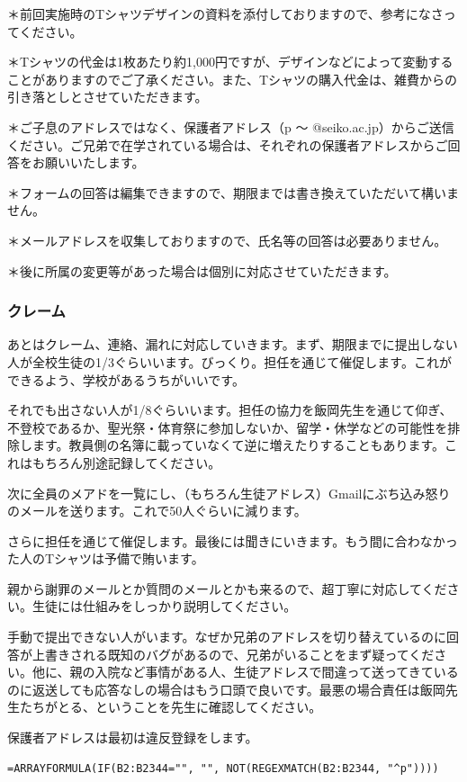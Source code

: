 \documentclass[dvipdfmx,jb5]{jreport}
\begin{document}
＊前回実施時のTシャツデザインの資料を添付しておりますので、参考になさってください。

＊Tシャツの代金は1枚あたり約1,000円ですが、デザインなどによって変動することがありますのでご了承ください。また、Tシャツの購入代金は、雑費からの引き落としとさせていただきます。

＊ご子息のアドレスではなく、保護者アドレス（p 〜 @seiko.ac.jp）からご送信ください。ご兄弟で在学されている場合は、それぞれの保護者アドレスからご回答をお願いいたします。

＊フォームの回答は編集できますので、期限までは書き換えていただいて構いません。

＊メールアドレスを収集しておりますので、氏名等の回答は必要ありません。

＊後に所属の変更等があった場合は個別に対応させていただきます。
\\

\subsubsection{クレーム}
あとはクレーム、連絡、漏れに対応していきます。まず、期限までに提出しない人が全校生徒の1/3ぐらいいます。びっくり。担任を通じて催促します。これができるよう、学校があるうちがいいです。

それでも出さない人が1/8ぐらいいます。担任の協力を飯岡先生を通じて仰ぎ、不登校であるか、聖光祭・体育祭に参加しないか、留学・休学などの可能性を排除します。教員側の名簿に載っていなくて逆に増えたりすることもあります。これはもちろん別途記録してください。

次に全員のメアドを一覧にし、（もちろん生徒アドレス）Gmailにぶち込み怒りのメールを送ります。これで50人ぐらいに減ります。

さらに担任を通じて催促します。最後には聞きにいきます。もう間に合わなかった人のTシャツは予備で賄います。

親から謝罪のメールとか質問のメールとかも来るので、超丁寧に対応してください。生徒には仕組みをしっかり説明してください。

手動で提出できない人がいます。なぜか兄弟のアドレスを切り替えているのに回答が上書きされる既知のバグがあるので、兄弟がいることをまず疑ってください。他に、親の入院など事情がある人、生徒アドレスで間違って送ってきているのに返送しても応答なしの場合はもう口頭で良いです。最悪の場合責任は飯岡先生たちがとる、ということを先生に確認してください。

保護者アドレスは最初は違反登録をします。

\begin{lstlisting}
=ARRAYFORMULA(IF(B2:B2344="", "", NOT(REGEXMATCH(B2:B2344, "^p"))))
\end{lstlisting}
\end{document}
